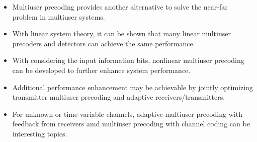\documentclass[20pt,landscape]{foils}
\begin{document}
\begin{itemize}
\item Multiuser precoding provides another alternative to solve
the near-far problem in multiuser systems.

\item With linear system theory, it can be shown that many linear
multiuser precoders and detectors can achieve the same
performance.

\item With considering the input information bits, nonlinear
multiuser precoding can be developed to further enhance system
performance.

\item Additional performance enhancement may be achievable by
jointly optimizing transmitter multiuser precoding and adaptive
receivers/transmitters.

\item For unknown or time-variable channels, adaptive multiuser
precoding with feedback from receivers  amd multiuser precoding
with channel coding can be interesting topics.

\end{itemize}
\end{document}
